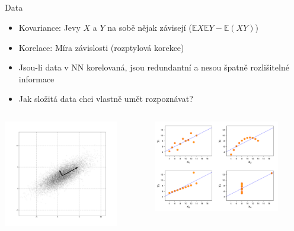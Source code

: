 \documentclass{beamer}
\begin{document}
\subsection{}
\begin{frame}{Data}
\begin{itemize}
\item Kovariance: Jevy $X$ a $Y$ na sobě nějak závisejí ($\mathbb{E}X\mathbb{E}Y - \mathbb{E}(XY)$)
\item Korelace: Míra závislosti (rozptylová korekce)
\item Jsou-li data v NN korelovaná, jsou redundantní a nesou špatně rozlišitelné informace
\item Jak složitá data chci vlastně umět rozpoznávat?
\end{itemize}
\begin{columns}
\begin{column}{5.5cm}
\includegraphics[width=5cm]{GaussianScatterPCA.png}
\end{column}
\begin{column}{5.5cm}
\includegraphics[width=5.5cm]{Anscombe's_quartet_3.pdf}
\end{column}
\end{columns}
\end{frame}
\end{document}
